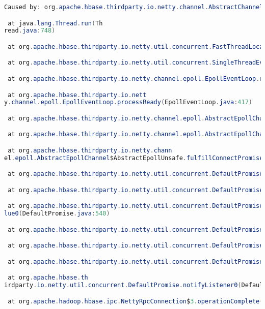 \documentclass{report}%
\begin{document}
\begin{enumerate}
\begin{lstlisting}[language=java]
Caused by: org.apache.hbase.thirdparty.io.netty.channel.AbstractChannel$AnnotatedConnectException: finishConnect(..) failed: No route to host: regionserver-1.hbase.hbase.svc.cluster.local/10.128.9.13:16020

 at java.lang.Thread.run(Th
read.java:748)

 at org.apache.hbase.thirdparty.io.netty.util.concurrent.FastThreadLocalRunnable.run(FastThreadLocalRunnable.java:30)

 at org.apache.hbase.thirdparty.io.netty.util.concurrent.SingleThreadEventExecutor$5.run(SingleThreadEventExecutor.java:905)

 at org.apache.hbase.thirdparty.io.netty.channel.epoll.EpollEventLoop.run(EpollEventLoop.java:328)

 at org.apache.hbase.thirdparty.io.nett
y.channel.epoll.EpollEventLoop.processReady(EpollEventLoop.java:417)

 at org.apache.hbase.thirdparty.io.netty.channel.epoll.AbstractEpollChannel$AbstractEpollUnsafe.epollOutReady(AbstractEpollChannel.java:524)

 at org.apache.hbase.thirdparty.io.netty.channel.epoll.AbstractEpollChannel$AbstractEpollUnsafe.finishConnect(AbstractEpollChannel.java:650)

 at org.apache.hbase.thirdparty.io.netty.chann
el.epoll.AbstractEpollChannel$AbstractEpollUnsafe.fulfillConnectPromise(AbstractEpollChannel.java:631)

 at org.apache.hbase.thirdparty.io.netty.util.concurrent.DefaultPromise.tryFailure(DefaultPromise.java:114)

 at org.apache.hbase.thirdparty.io.netty.util.concurrent.DefaultPromise.setFailure0(DefaultPromise.java:533)

 at org.apache.hbase.thirdparty.io.netty.util.concurrent.DefaultPromise.setVa
lue0(DefaultPromise.java:540)

 at org.apache.hbase.thirdparty.io.netty.util.concurrent.DefaultPromise.notifyListeners(DefaultPromise.java:415)

 at org.apache.hbase.thirdparty.io.netty.util.concurrent.DefaultPromise.notifyListenersNow(DefaultPromise.java:474)

 at org.apache.hbase.thirdparty.io.netty.util.concurrent.DefaultPromise.notifyListeners0(DefaultPromise.java:495)

 at org.apache.hbase.th
irdparty.io.netty.util.concurrent.DefaultPromise.notifyListener0(DefaultPromise.java:502)

 at org.apache.hadoop.hbase.ipc.NettyRpcConnection$3.operationComplete(NettyRpcConnection.java:261)


\end{lstlisting}
\end{enumerate}
\end{document}
